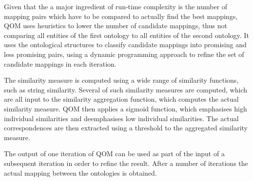 \documentclass{fast_latex}
\begin{document}
Given that the a major ingredient of run-time complexity is the number
of mapping pairs which have to be compared to actually find the best
mappings, QOM uses heuristics to lower the number of candidate
mappings, thus not comparing all entities of the first ontology to all
entities of the second ontology. It uses the ontological structures to
classify candidate mappings into promising and less promising pairs,
using a dynamic programming approach to refine the set of candidate
mappings in each iteration. 

The similarity measure is computed using a wide range of similarity
functions, such as string similarity. Several of such similarity
measures are computed, which are all input to the similarity
aggregation function, which computes the actual similarity measure. QOM
then applies a sigmoid function, which emphasises high individual
similarities and deemphasises low individual similarities. The actual
correspondences are then extracted using a threshold to the aggregated
similarity measure. 

The output of one iteration of QOM can be used as part of the input of a
subsequent iteration in order to refine the result. After a number of
iterations the actual mapping between the ontologies is obtained. 
\end{document}
